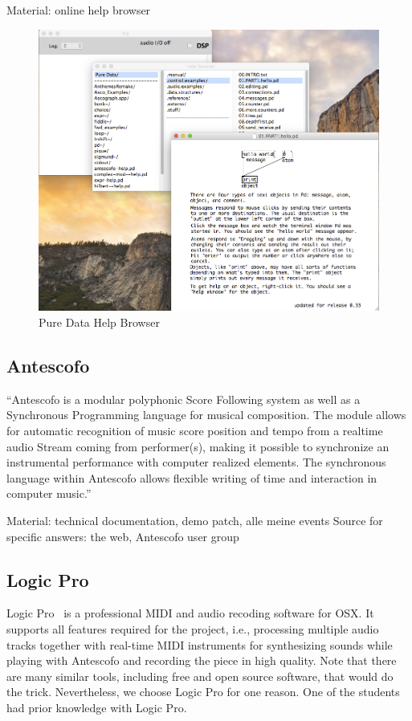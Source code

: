 \documentclass[onecolumn,nocopyrightspace,preprint]{sigplanconf}
\begin{document}
Material: online help browser

\begin{figure}[ht]
    \centering
    \includegraphics[scale=0.4]{fig/pd-help-browser.png}
    \caption{Pure Data Help Browser}
    \label{fig:pd-help-browser}
\end{figure}


\subsection{Antescofo}

``Antescofo is a modular polyphonic Score Following system as well as a
Synchronous Programming language for musical composition. The module allows
for automatic recognition of music score position and tempo from a realtime
audio Stream coming from performer(s), making it possible to synchronize an
instrumental performance with computer realized elements. The synchronous
language within Antescofo allows flexible writing of time and interaction in
computer music.''~\cite{website:antescofo}

Material: technical documentation, demo patch, alle meine events
Source for specific answers: the web, Antescofo user group

\subsection{Logic Pro}

Logic Pro~\cite{website:logic} is a professional MIDI and audio recoding
software for OSX. It supports all features required for the project, i.e.,
processing multiple audio tracks together with real-time MIDI instruments for
synthesizing sounds while playing with Antescofo and recording the piece in
high quality.  Note that there are many similar tools, including free and open
source software, that would do the trick. Nevertheless, we choose Logic Pro
for one reason. One of the students had prior knowledge with Logic Pro.
\end{document}
